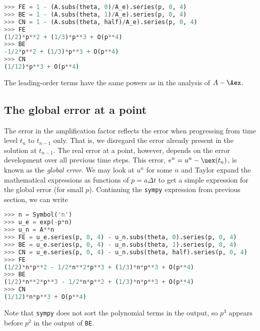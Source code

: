 \documentclass[graybox,sectrefs,envcountresetchap,open=right,final]{svmonodo}
\begin{document}
\begin{lstlisting}[language=python,style=blue1_bluegreen]
>>> FE = 1 - (A.subs(theta, 0)/A_e).series(p, 0, 4)
>>> BE = 1 - (A.subs(theta, 1)/A_e).series(p, 0, 4)
>>> CN = 1 - (A.subs(theta, half)/A_e).series(p, 0, 4)
>>> FE
(1/2)*p**2 + (1/3)*p**3 + O(p**4)
>>> BE
-1/2*p**2 + (1/3)*p**3 + O(p**4)
>>> CN
(1/12)*p**3 + O(p**4)

\end{lstlisting}

The leading-order terms have the same powers as
in the analysis of $A-\Aex$.

\subsection{The global error at a point}
\label{decay:analysis:gobal:error}


The error in the amplification factor reflects the error when
progressing from time level $t_n$ to $t_{n-1}$ only. That is,
we disregard the error already present in the solution at $t_{n-1}$.
The real error at a point, however, depends on the error development
over all previous time steps. This error,
$e^n = u^n-\uex(t_n)$, is known as the \emph{global error}. We
may look at $u^n$ for some $n$ and Taylor expand the
mathematical expressions as functions of $p=a\Delta t$ to get a simple
expression for the global error (for small $p$). Continuing the
\texttt{sympy} expression from previous section, we can write














\begin{lstlisting}[language=python,style=blue1_bluegreen]
>>> n = Symbol('n')
>>> u_e = exp(-p*n)
>>> u_n = A**n
>>> FE = u_e.series(p, 0, 4) - u_n.subs(theta, 0).series(p, 0, 4)
>>> BE = u_e.series(p, 0, 4) - u_n.subs(theta, 1).series(p, 0, 4)
>>> CN = u_e.series(p, 0, 4) - u_n.subs(theta, half).series(p, 0, 4)
>>> FE
(1/2)*n*p**2 - 1/2*n**2*p**3 + (1/3)*n*p**3 + O(p**4)
>>> BE
(1/2)*n**2*p**3 - 1/2*n*p**2 + (1/3)*n*p**3 + O(p**4)
>>> CN
(1/12)*n*p**3 + O(p**4)

\end{lstlisting}

Note that \texttt{sympy} does not sort the polynomial terms in the output,
so $p^3$ appears before $p^2$ in the output of \texttt{BE}.
\end{document}
